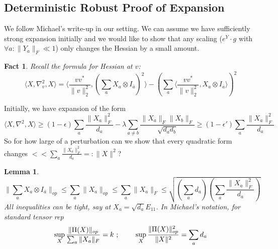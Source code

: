 \documentclass{article}
\newtheorem{lemma}[theorem]{Lemma}
\newtheorem{fact}[theorem]{Fact}
\begin{document}
\subsection{Deterministic Robust Proof of Expansion}

We follow Michael's write-up in our setting. We can assume we have sufficiently strong expansion initially and we would like to show that any scaling ($e^{Y} \cdot g$ with $\forall a: \|Y_{a}\|_{F} \ll 1$) only changes the Hessian by a small amount.
\begin{fact}
Recall the formula for Hessian at $v$:
\[ \langle X, \nabla_{v}^{2}, X \rangle = \langle \frac{v v^{*}}{\|v\|_{2}^{2}}, \left( \sum_{a} X_{a} \otimes I_{\overline{a}}  \right)^{2} \rangle - \left( \sum_{a} \langle \frac{v v^{*}}{\|v\|_{2}^{2}}, X_{a} \otimes I_{\overline{a}} \rangle  \right)^{2}  \]
\end{fact}

Initially, we have expansion of the form
\[ \langle X, \nabla^{2}, X \rangle \geq (1-\epsilon) \sum_{a} \frac{\|X_{a}\|_{F}^{2}}{d_{a}} - \lambda \sum_{a \neq b} \frac{\|X_{a}\|_{F} \|X_{b}\|_{F}}{\sqrt{d_{a} d_{b}}} \geq (1-\epsilon') \sum_{a} \frac{\|X_{a}\|_{F}^{2}}{d_{a}}   \]
So for how large of a perturbation can we show that every quadratic form changes $<< \sum_{a} \frac{\|X_{a}\|_{F}^{2}}{d_{a}} =: \|X\|^{2}$?

\begin{lemma}
\[ \|\sum_{a} X_{a} \otimes I_{\overline{a}}\|_{op} \leq \sum_{a} \|X_{a}\|_{op} \leq \sum_{a} \|X_{a}\|_{F} \leq \sqrt{ \left( \sum_{a} d_{a} \right) \left( \sum_{a} \frac{\|X_{a}\|_{F}^{2}}{d_{a}}  \right)} \]
All inequalities can be tight, say at $X_{a} = \sqrt{d_{a}} E_{11}$. In Michael's notation, for standard tensor rep
\[ \sup_{X} \frac{\|\Pi(X)\|_{op}}{\sum_{a} \|X_{a}\|_{F}} = k  \text{  ;  } \hspace{7mm}
\sup_{X} \frac{\|\Pi(X)\|_{op}^{2}}{\|X\|^{2}} = \sum_{a} d_{a}  \]
\end{lemma}
\end{document}

